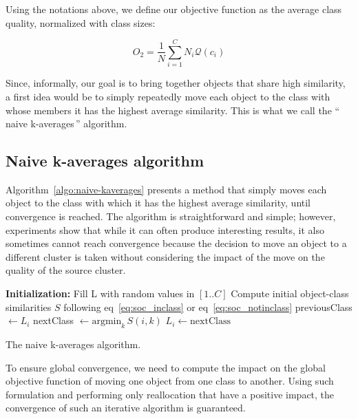 \documentclass[10pt,journal,compsoc]{IEEEtran}
\newcommand{\gl}[1]{``\,#1\,''} %
\begin{document}
Using the notations above, we define our objective function as the average class quality, normalized with class sizes:

\[
O_2 = \frac{1}{N} \sum_{i=1}^{C} N_i \mathcal{Q}(c_i)
\]

Since, informally, our goal is to bring together objects that share high similarity, a first idea would be to simply repeatedly move each object to the class with whose members it has the highest average similarity. This is what we call the \gl{naive k-averages} algorithm.

\subsection{Naive k-averages algorithm}

Algorithm~\ref{algo:naive-kaverages} presents a method that simply moves each object to the class with which it has the highest average similarity, until convergence is reached. The algorithm is straightforward and simple; however, experiments show that while it can often produce interesting results, it also sometimes cannot reach convergence because the decision to move an object to a different cluster is taken without considering the impact of the move on the quality of the source cluster.

\begin{algorithm}
	\label{algo:naive-kaverages}
	\SetAlgoLined
	\BlankLine	
	\textbf{Initialization:} 
		Fill L with random values in $[1..C]$\;
		Compute initial object-class similarities $S$ following eq~\ref{eq:soc_inclass} or eq~\ref{eq:soc_notinclass}\;
	\BlankLine	
	 {
		 {
			previousClass $\leftarrow L_i$\;
			nextClass $\leftarrow \mathrm{argmin}_k\, S(i, k)$
			 {
				$L_i \leftarrow \mathrm{nextClass}$\;
			}
		}
	}
	\BlankLine
	\caption{The naive k-averages algorithm.}
\end{algorithm}

To ensure global convergence, we need to compute the impact on the global objective function of moving one object from one class to another. Using such formulation and performing only reallocation that have a positive impact, the convergence of such an iterative algorithm is guaranteed. 
\end{document}
